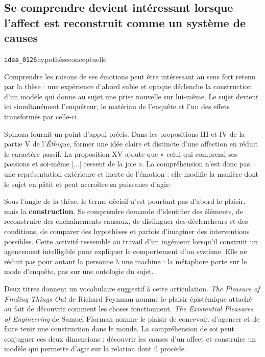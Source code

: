\documentclass[10pt,a4paper]{article}
\begin{document}
\subsection{Se comprendre devient intéressant lorsque l'affect est reconstruit comme un système de causes}
{\small\color{metadata} \texttt{idea\_0126}\quad\textbullet\quad hypothèse\quad\textbullet\quad conceptuelle\par}

Comprendre les raisons de ses émotions peut être intéressant au sens fort retenu par la thèse : une expérience d'abord subie et opaque déclenche la construction d'un modèle qui donne au sujet une prise nouvelle sur lui-même. Le sujet devient ici simultanément l'enquêteur, le matériau de l'enquête et l'un des effets transformés par celle-ci.

Spinoza fournit un point d'appui précis. Dans les propositions III et IV de la partie V de l'\emph{Éthique}, former une idée claire et distincte d'une affection en réduit le caractère passif. La proposition XV ajoute que « celui qui comprend ses passions et soi-même [...] ressent de la joie ». La compréhension n'est donc pas une représentation extérieure et inerte de l'émotion : elle modifie la manière dont le sujet en pâtit et peut accroître sa puissance d'agir.

Sous l'angle de la thèse, le terme décisif n'est pourtant pas d'abord le plaisir, mais la \textbf{construction}. Se comprendre demande d'identifier des éléments, de reconstruire des enchaînements causaux, de distinguer des déclencheurs et des conditions, de comparer des hypothèses et parfois d'imaginer des interventions possibles. Cette activité ressemble au travail d'un ingénieur lorsqu'il construit un agencement intelligible pour expliquer le comportement d'un système. Elle ne réduit pas pour autant la personne à une machine : la métaphore porte sur le mode d'enquête, pas sur une ontologie du sujet.

Deux titres donnent un vocabulaire suggestif à cette articulation. \emph{The Pleasure of Finding Things Out} de Richard Feynman nomme le plaisir épistémique attaché au fait de découvrir comment les choses fonctionnent. \emph{The Existential Pleasures of Engineering} de Samuel Florman nomme le plaisir de concevoir, d'agencer et de faire tenir une construction dans le monde. La compréhension de soi peut conjuguer ces deux dimensions : découvrir les causes d'un affect et construire un modèle qui permette d'agir sur la relation dont il procède.
\end{document}

